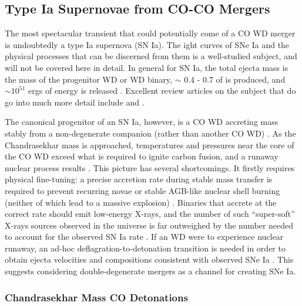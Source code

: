 \subsection{Type Ia Supernovae from CO-CO Mergers}

The most spectacular transient that could potentially come of a CO WD merger is undoubtedly a type Ia supernova (SN Ia).  The ight curves of SNe Ia and the physical processes that can be discerned from them is a well-studied subject, and will not be covered here in detail.  In general for SN Ia, the total ejecta mass is the mass of the progenitor WD or WD binary, $\sim$ 0.4 - 0.7 {\Msun} of {\Ni} is produced, and $\sim 10^{51}$ ergs of energy is released \citep{blin+06}.  Excellent review articles on the subject that do go into much more detail include \cite{howe10} and \cite{hilln00}.

The canonical progenitor of an SN Ia, however, is a CO WD accreting mass stably from a non-degenerate companion (rather than another CO WD) \citep{hilln00,howe10}.  As the Chandrasekhar mass {\Mchan} is approached, temperatures and pressures near the core of the CO WD exceed what is required to ignite carbon fusion, and a runaway nuclear process results \citep{hilln00,howe10}.  This picture has several shortcomings.  It firstly requires physical fine-tuning: a precise accretion rate during stable mass transfer is required to prevent recurring novae or stable AGB-like nuclear shell burning (neither of which lead to a massive explosion) \citep{vkercj10,howe10}.  Binaries that accrete at the correct rate should emit low-energy X-rays, and the number of such ``super-soft'' X-rays sources observed in the universe is far outweighed by the number needed to account for the observed SN Ia rate \citep{vkercj10,howe10}.  If an {\Mchan} WD were to experience nuclear runaway, an ad-hoc deflagration-to-detonation transition is needed in order to obtain ejecta velocities and compositions consistent with observed SNe Ia \citep{hilln00,howe10}.  This suggests considering double-degenerate mergers as a channel for creating SNe Ia.


\subsubsection{Chandrasekhar Mass CO Detonations}

